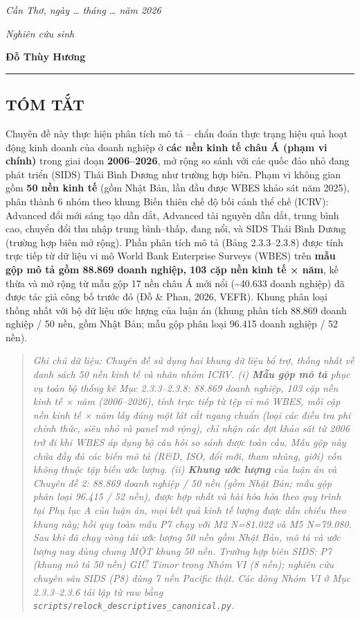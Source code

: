 \documentclass[
  a4paper,
  13pt]{extreport}
\begin{document}
\emph{Cần Thơ, ngày \ldots{} tháng \ldots{} năm 2026}

\emph{Nghiên cứu sinh}

\textbf{Đỗ Thùy Hương}

\begin{center}\rule{0.5\linewidth}{0.5pt}\end{center}

\hypertarget{tuxf3m-tux1eaft}{%
\subsection{TÓM TẮT}\label{tuxf3m-tux1eaft}}

Chuyên đề này thực hiện phân tích mô tả -- chẩn đoán thực trạng hiệu quả
hoạt động kinh doanh của doanh nghiệp ở \textbf{các nền kinh tế châu Á
(phạm vi chính)} trong giai đoạn \textbf{2006--2026}, mở rộng so sánh
với các quốc đảo nhỏ đang phát triển (SIDS) Thái Bình Dương như trường
hợp biên. Phạm vi không gian gồm \textbf{50 nền kinh tế} (gồm Nhật Bản,
lần đầu được WBES khảo sát năm 2025), phân thành 6 nhóm theo khung Biến
thiên chế độ bối cảnh thể chế (ICRV): Advanced đổi mới sáng tạo dẫn dắt,
Advanced tài nguyên dẫn dắt, trung bình cao, chuyển đổi thu nhập trung
bình--thấp, đang nổi, và SIDS Thái Bình Dương (trường hợp biên mở rộng).
Phần phân tích mô tả (Bảng 2.3.3--2.3.8) được tính trực tiếp từ dữ liệu
vi mô World Bank Enterprise Surveys (WBES) trên \textbf{mẫu gộp mô tả
gồm 88.869 doanh nghiệp, 103 cặp nền kinh tế × năm}, kế thừa và mở rộng
từ mẫu gộp 17 nền châu Á mới nổi (\textasciitilde40.633 doanh nghiệp) đã
được tác giả công bố trước đó (Đỗ \& Phan, 2026, VEFR). Khung phân loại
thống nhất với bộ dữ liệu ước lượng của luận án (khung phân tích 88.869
doanh nghiệp / 50 nền, gồm Nhật Bản; mẫu gộp phân loại 96.415 doanh
nghiệp / 52 nền).

\begin{quote}
\emph{Ghi chú dữ liệu: Chuyên đề sử dụng hai khung dữ liệu bổ trợ, thống
nhất về danh sách 50 nền kinh tế và nhãn nhóm ICRV. (i) \textbf{Mẫu gộp
mô tả} phục vụ toàn bộ thống kê Mục 2.3.3--2.3.8: 88.869 doanh nghiệp,
103 cặp nền kinh tế × năm (2006--2026), tính trực tiếp từ tệp vi mô
WBES, mỗi cặp nền kinh tế × năm lấy đúng một lát cắt ngang chuẩn (loại
các điều tra phi chính thức, siêu nhỏ và panel mở rộng), chỉ nhận các
đợt khảo sát từ 2006 trở đi khi WBES áp dụng bộ câu hỏi so sánh được
toàn cầu. Mẫu gộp này chứa đầy đủ các biến mô tả (R\&D, ISO, đổi mới,
tham nhũng, giới) vốn không thuộc tập biến ước lượng. (ii) \textbf{Khung
ước lượng} của luận án và Chuyên đề 2: 88.869 doanh nghiệp / 50 nền (gồm
Nhật Bản; mẫu gộp phân loại 96.415 / 52 nền), được hợp nhất và hài hòa
hóa theo quy trình tại Phụ lục A của luận án, mọi kết quả kinh tế lượng
được dẫn chiếu theo khung này; hồi quy toàn mẫu P7 chạy với M2 N=81.022
và M5 N=79.080. Sau khi đã chạy vòng tái ước lượng 50 nền gồm Nhật Bản,
mô tả và ước lượng nay dùng chung MỘT khung 50 nền. Trường hợp biên
SIDS: P7 (khung mô tả 50 nền) GIỮ Timor trong Nhóm VI (8 nền); nghiên
cứu chuyên sâu SIDS (P8) dùng 7 nền Pacific thật. Các dòng Nhóm VI ở Mục
2.3.3--2.3.6 tái lập từ raw bằng
\texttt{scripts/relock\_descriptives\_canonical.py}.}
\end{quote}
\end{document}
